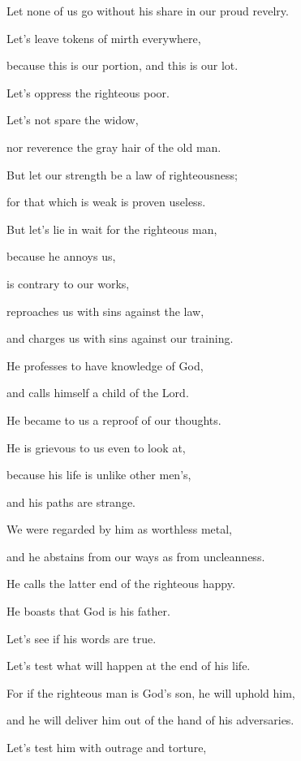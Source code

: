 {\par }{\Q {}Let none of us go without his share in our proud revelry.
\par }{\QB Let’s leave tokens of mirth everywhere,
\par }{\QB because this is our portion, and this is our lot.
\par }{\Q {}Let’s oppress the righteous poor.
\par }{\QB Let’s not spare the widow,
\par }{\QB nor reverence the gray hair of the old man.
\par }{\Q {}But let our strength be a law of righteousness;
\par }{\QB for that which is weak is proven useless.
\par }{\Q {}But let’s lie in wait for the righteous man,
\par }{\QB because he annoys us,
\par }{\QB is contrary to our works,
\par }{\QB reproaches us with sins against the law,
\par }{\QB and charges us with sins against our training.
\par }{\Q {}He professes to have knowledge of God,
\par }{\QB and calls himself a child of the Lord.
\par }{\Q {}He became to us a reproof of our thoughts.
\par }{\Q {}He is grievous to us even to look at,
\par }{\QB because his life is unlike other men’s,
\par }{\QB and his paths are strange.
\par }{\Q {}We were regarded by him as worthless metal,
\par }{\QB and he abstains from our ways as from uncleanness.
\par }{\QB He calls the latter end of the righteous happy.
\par }{\QB He boasts that God is his father.
\par }{\Q {}Let’s see if his words are true.
\par }{\QB Let’s test what will happen at the end of his life.
\par }{\Q {}For if the righteous man is God’s son, he will uphold him,
\par }{\QB and he will deliver him out of the hand of his adversaries.
\par }{\Q {}Let’s test him with outrage and torture,
}

